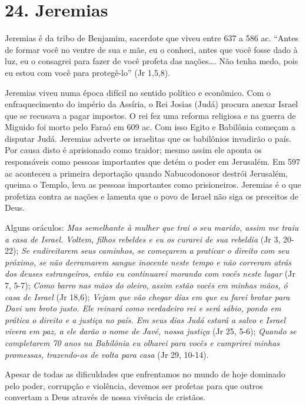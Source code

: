 \documentclass[
]{book}
\begin{document}
\hypertarget{jeremias}{%
\section*{24. Jeremias}\label{jeremias}}

Jeremias é da tribo de Benjamim, sacerdote que viveu entre 637 a 586 ac. ``Antes de formar você no ventre de sua e mãe, eu o conheci, antes que você fosse dado à luz, eu o consagrei para fazer de você profeta das nações\ldots. Não tenha medo, pois eu estou com você para protegê-lo'' (Jr 1,5,8).

Jeremias viveu numa época difícil no sentido político e econômico. Com o enfraquecimento do império da Assíria, o Rei Josias (Judá) procura anexar Israel que se recusava a pagar impostos. O rei fez uma reforma religiosa e na guerra de Miguido foi morto pelo Faraó em 609 ac. Com isso Egito e Babilônia começam a disputar Judá. Jeremias adverte os israelitas que os babilônios invadirão o país. Por causa disto é aprisionado como traidor; mesmo assim ele aponta os responsáveis como pessoas importantes que detém o poder em Jerusalém. Em 597 ac aconteceu a primeira deportação quando Nabucodonosor destrói Jerusalém, queima o Templo, leva as pessoas importantes como prisioneiros. Jeremias é o que profetiza contra as nações e lamenta que o povo de Israel não siga os preceitos de Deus.

Alguns oráculos: \emph{Mas semelhante à mulher que trai o seu marido, assim me traiu a casa de Israel. Voltem, filhos rebeldes e eu os curarei de sua rebeldia} (Jr 3, 20-22); \emph{Se endireitarem seus caminhos, se começarem a praticar o direito com seu próximo, se não derramarem sangue inocente neste tempo e não correram atrás dos deuses estrangeiros, então eu continuarei morando com vocês neste lugar} (Jr 7, 5-7); \emph{Como barro nas mãos do oleiro, assim estão vocês em minhas mãos, ó casa de Israel} (Jr 18,6); \emph{Vejam que vão chegar dias em que eu farei brotar para Davi um broto justo. Ele reinará como verdadeiro rei e será sábio, pondo em prática o direito e a justiça no país. Em seus dias Judá estará a salvo e Israel vivera em paz, a ele darão o nome de Javé, nossa justiça} (Jr 25, 5-6); \emph{Quando se completarem 70 anos na Babilônia eu olharei para vocês e cumprirei minhas promessas, trazendo-os de volta para casa} (Jr 29, 10-14).

Apesar de todas as dificuldades que enfrentamos no mundo de hoje dominado pelo poder, corrupção e violência, devemos ser profetas para que outros convertam a Deus através de nossa vivência de cristãos.
\end{document}

